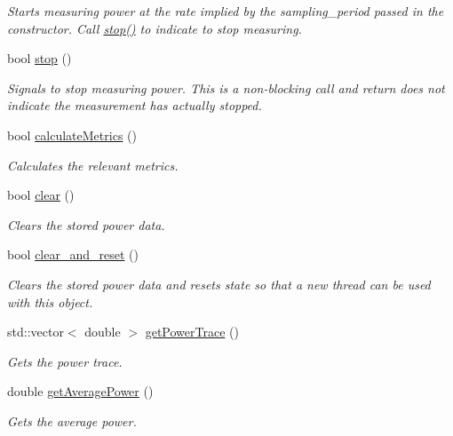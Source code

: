 \begin{DoxyCompactItemize}
\begin{DoxyCompactList}\small\item\em Starts measuring power at the rate implied by the sampling\+\_\+period passed in the constructor. Call \hyperlink{classxmem_1_1power_1_1_power_reader_a5c28efc4aece34a5469d067a133920f4}{stop()} to indicate to stop measuring. \end{DoxyCompactList}\item 
bool \hyperlink{classxmem_1_1power_1_1_power_reader_a5c28efc4aece34a5469d067a133920f4}{stop} ()
\begin{DoxyCompactList}\small\item\em Signals to stop measuring power. This is a non-\/blocking call and return does not indicate the measurement has actually stopped. \end{DoxyCompactList}\item 
bool \hyperlink{classxmem_1_1power_1_1_power_reader_a953d6b42a83c8c0b709aa49b994c6803}{calculate\+Metrics} ()
\begin{DoxyCompactList}\small\item\em Calculates the relevant metrics. \end{DoxyCompactList}\item 
bool \hyperlink{classxmem_1_1power_1_1_power_reader_a17b206d91ad607dc6fbcd4f2e0f66684}{clear} ()
\begin{DoxyCompactList}\small\item\em Clears the stored power data. \end{DoxyCompactList}\item 
bool \hyperlink{classxmem_1_1power_1_1_power_reader_a6377973eed59cd99bcb475c17e5cb0f2}{clear\+\_\+and\+\_\+reset} ()
\begin{DoxyCompactList}\small\item\em Clears the stored power data and resets state so that a new thread can be used with this object. \end{DoxyCompactList}\item 
std\+::vector$<$ double $>$ \hyperlink{classxmem_1_1power_1_1_power_reader_af41f0300055c2ec45785cc4e77864a7d}{get\+Power\+Trace} ()
\begin{DoxyCompactList}\small\item\em Gets the power trace. \end{DoxyCompactList}\item 
double \hyperlink{classxmem_1_1power_1_1_power_reader_a2b20b7e6a22dad732cdb166d90fcfe98}{get\+Average\+Power} ()
\begin{DoxyCompactList}\small\item\em Gets the average power. \end{DoxyCompactList}\item 

\end{DoxyCompactItemize}
